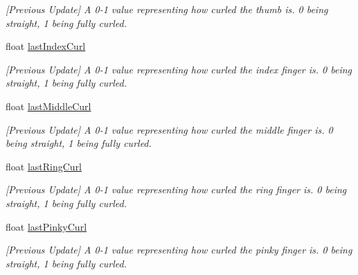 \begin{DoxyCompactItemize}
\begin{DoxyCompactList}\small\item\em \mbox{[}Previous Update\mbox{]} A 0-\/1 value representing how curled the thumb is. 0 being straight, 1 being fully curled. \end{DoxyCompactList}\item 
float \mbox{\hyperlink{class_valve_1_1_v_r_1_1_steam_v_r___action___skeleton___source_abfcf2cc02eb5bccf7b7b88572ffa2b86}{last\+Index\+Curl}}
\begin{DoxyCompactList}\small\item\em \mbox{[}Previous Update\mbox{]} A 0-\/1 value representing how curled the index finger is. 0 being straight, 1 being fully curled. \end{DoxyCompactList}\item 
float \mbox{\hyperlink{class_valve_1_1_v_r_1_1_steam_v_r___action___skeleton___source_a734295b474070aae8e37011cbf6e4faa}{last\+Middle\+Curl}}
\begin{DoxyCompactList}\small\item\em \mbox{[}Previous Update\mbox{]} A 0-\/1 value representing how curled the middle finger is. 0 being straight, 1 being fully curled. \end{DoxyCompactList}\item 
float \mbox{\hyperlink{class_valve_1_1_v_r_1_1_steam_v_r___action___skeleton___source_a5f878d6e852719151688c69fb8c126d5}{last\+Ring\+Curl}}
\begin{DoxyCompactList}\small\item\em \mbox{[}Previous Update\mbox{]} A 0-\/1 value representing how curled the ring finger is. 0 being straight, 1 being fully curled. \end{DoxyCompactList}\item 
float \mbox{\hyperlink{class_valve_1_1_v_r_1_1_steam_v_r___action___skeleton___source_af4ae4f533115235085c78796c44115ad}{last\+Pinky\+Curl}}
\begin{DoxyCompactList}\small\item\em \mbox{[}Previous Update\mbox{]} A 0-\/1 value representing how curled the pinky finger is. 0 being straight, 1 being fully curled. \end{DoxyCompactList}\item 

\end{DoxyCompactItemize}
